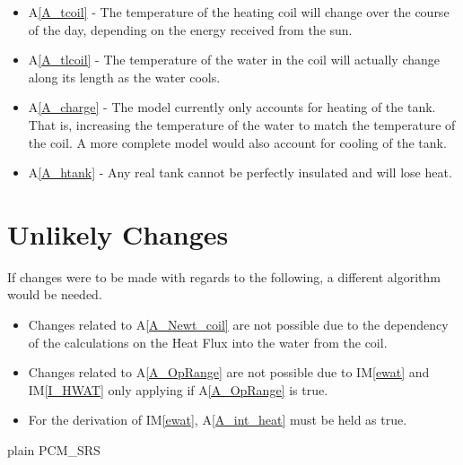 \documentclass[12pt]{article}
\newcounter{ucnum}
\newcommand{\ltheucnum}{UC\theucnum}
\newcommand{\aref}[1]{A\ref{#1}}
\newcommand{\iref}[1]{IM\ref{#1}}
\newcounter{lcnum} %
\begin{document}
\noindent \begin{itemize}


\item[LC\refstepcounter{lcnum}\thelcnum \label{LC_tcoil}:]\aref{A_tcoil} - The
  temperature of the heating coil will change over the course of the day,
  depending on the energy received from the sun.

\item[LC\refstepcounter{lcnum}\thelcnum \label{LC_tlcoil}:]\aref{A_tlcoil} - The
  temperature of the water in the coil will actually change along its length as
  the water cools.

\item[LC\refstepcounter{lcnum}\thelcnum \label{LC_charge}:]\aref{A_charge} - The 
  model currently only accounts for heating of the tank. That is, increasing the 
  temperature of the water to match the temperature of the coil. A 
  more complete model would also account for cooling of the tank.


\item[LC\refstepcounter{lcnum}\thelcnum \label{LC_htank}:]\aref{A_htank} - Any
  real tank cannot be perfectly insulated and will lose heat.

\end{itemize}

\section{Unlikely Changes}
If changes were to be made with regards to the following, a different algorithm would be needed.

\begin{itemize}
\item[\refstepcounter{ucnum}\ltheucnum \label{UC_convCooling}:] Changes related to \aref{A_Newt_coil} are not possible due to the dependency of the calculations on the Heat Flux into the water from the coil.
\item[\refstepcounter{ucnum}\ltheucnum \label{UC_opRange}:] Changes related to \aref{A_OpRange} are not possible due to \iref{ewat} and \iref{I_HWAT} only applying if \aref{A_OpRange} is true.
\item[\refstepcounter{ucnum}\ltheucnum \label{UC_intHeat}:] For the derivation of \iref{ewat}, \aref{A_int_heat} must be held as true. 
\end{itemize}

 {plain}
 {PCM_SRS}
\end{document}
